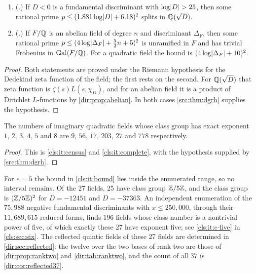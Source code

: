 \begin{lemma}\label{cls:lem:splitprime}
\begin{enumerate}[label=\textup{(\alph*)}]
\item \textup{(\cite[Theorem~3]{Elsenhans2020Imaginary}.)} If $D<0$ is a fundamental
discriminant with $\log\lvert D\rvert>25$, then some rational prime
$p\le(1.881\log\lvert D\rvert+6.18)^2$ splits in $\mathbb{Q}(\sqrt D)$.
\item \textup{(\cite[Theorem~5.1]{Bach1996Explicit}.)} If $F/\mathbb{Q}$ is an abelian field of
degree $n$ and discriminant $\Delta_F$, then some rational prime
$p\le(4\log\lvert\Delta_F\rvert+\tfrac52n+5)^2$ is unramified in $F$ and has trivial Frobenius
in $\operatorname{Gal}(F/\mathbb{Q})$. For a quadratic field the bound is $(4\log\lvert\Delta_F\rvert+10)^2$.
\end{enumerate}
\end{lemma}

\begin{proof}
Both statements are proved under the Riemann hypothesis for the Dedekind zeta function
of the field; the first rests on the second. For $\mathbb{Q}(\sqrt D)$ that zeta function is
$\zeta(s)L(s,\chi_D)$, and for an abelian field it is a product of Dirichlet $L$-functions
by \cref{dir:prop:abelian}. In both cases \cref{src:thm:dgrh} supplies the hypothesis.
\end{proof}

\begin{proposition}\label{cls:prop:small}
The numbers of imaginary quadratic fields whose class group has exact exponent
$1$, $2$, $3$, $4$, $5$ and $8$ are $9$, $56$, $17$, $203$, $27$ and $778$ respectively.
\end{proposition}

\begin{proof}
This is \ref{cls:it:census} and \ref{cls:it:complete}, with the hypothesis supplied by
\cref{src:thm:dgrh}.
\end{proof}

\begin{remark}\label{cls:rem:five}
For $e=5$ the bound in \ref{cls:it:bound} lies inside the enumerated range, so no interval
remains. Of the 27 fields, 25 have class group $\mathbb{Z}/5\mathbb{Z}$, and the class group is
$(\mathbb{Z}/5\mathbb{Z})^2$ for $D=-12451$ and $D=-37363$. An independent enumeration of the $75{,}988$
negative fundamental discriminants with $x\le250{,}000$, through their $11{,}689{,}615$
reduced forms, finds 196 fields whose class number is a nontrivial power of five, of which
exactly these 27 have exponent five; see \ref{cls:it:c-five} in \cref{cls:sec:six}. The
reflected quintic fields of these 27 fields are determined in \cref{dir:sec:reflected}: the
twelve over the two bases of rank two are those of \cref{dir:prop:ranktwo} and
\cref{dir:tab:ranktwo}, and the count of all $37$ is \cref{dir:cor:reflected37}.
\end{remark}

